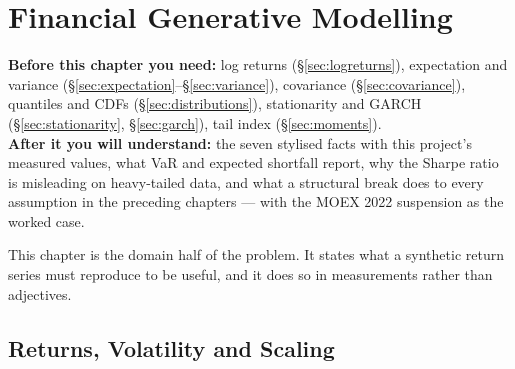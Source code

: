 \chapter{Financial Generative Modelling}
\label{ch:financial}

\begin{tcolorbox}[feynbox={Sky}{BBg},title={Before and After}]
\textbf{Before this chapter you need:} log returns (\S\ref{sec:logreturns}),
expectation and variance (\S\ref{sec:expectation}--\S\ref{sec:variance}),
covariance (\S\ref{sec:covariance}), quantiles and CDFs
(\S\ref{sec:distributions}), stationarity and GARCH
(\S\ref{sec:stationarity}, \S\ref{sec:garch}), tail index
(\S\ref{sec:moments}).\\
\textbf{After it you will understand:} the seven stylised facts with this
project's measured values, what VaR and expected shortfall report, why the Sharpe
ratio is misleading on heavy-tailed data, and what a structural break does to
every assumption in the preceding chapters --- with the MOEX 2022 suspension as
the worked case.
\end{tcolorbox}

This chapter is the domain half of the problem. It states what a synthetic return
series must reproduce to be useful, and it does so in measurements rather than
adjectives.

\section{Returns, Volatility and Scaling}
\label{sec:volatility}



